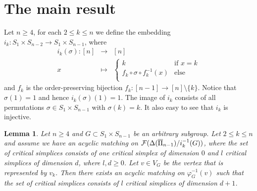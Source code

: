 \documentclass{elsarticle}
\newtheorem{lem}[df]{Lemma}
\begin{document}
\section{The main result}
Let $n\geq 4$, for each $2\leq k\leq n$ we define the embedding $i_k:S_1\times S_{n-2}\longrightarrow S_1\times S_{n-1}$, where
\begin{eqnarray*}
i_k(\sigma):[n]&\longrightarrow&[n]\\
x&\longmapsto&
\begin{cases}
k&\text{if $x=k$}\\
f_k\circ\sigma\circ f_k^{-1}(x)&\text{else}\\
\end{cases}
\end{eqnarray*}
and $f_k$ is the order-preserving bijection $f_k:[n-1]\longrightarrow[n]\setminus\{k\}$. Notice that $\sigma(1)=1$ and hence $i_k(\sigma)(1)=1$. The image of $i_k$ consists of all permutations $\sigma\in S_1\times S_{n-1}$ with $\sigma(k)=k$. It also easy to see that $i_k$ is injective.
\begin{lem}
\label{indlemma}
Let $n\geq 4$ and $G\subset S_1\times S_{n-1}$ be an arbitrary subgroup. Let $2\leq k\leq n$ and assume we have an acyclic matching on ${\cal F}(\Delta(\overline{\Pi}_{n-1})/i_k^{-1}(G))$, where the set of critical simplices consists of one critical simplex of dimension $0$ and $l$ critical simplices of dimension $d$, where $l,d\geq 0$. Let $v\in V_G$ be the vertex that is represented by $v_k$. Then there exists an acyclic matching on $\varphi_G^{-1}(v)$ such that the set of critical simplices consists of $l$ critical simplices of dimension $d+1$.
\end{lem}
\end{document}

